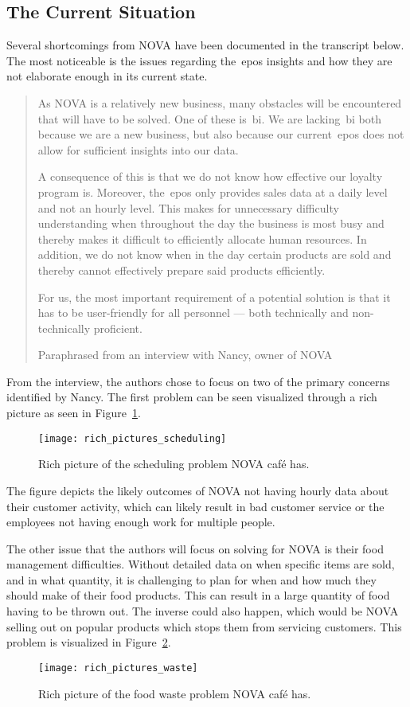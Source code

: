 \subsection{The Current Situation}\label{subsec:the-current-situation}

Several shortcomings from NOVA have been documented in the transcript below.
The most noticeable is the issues regarding the~\acrfull{epos} insights and how they are not elaborate enough in its
current state.

\blockquote[Paraphrased from an interview with Nancy, owner of NOVA]{As NOVA is a relatively new business, many
obstacles will be encountered that will have to be solved.
One of these is~\acrfull{bi}.
We are lacking~\acrshort{bi} both because we are a new business, but also because our current~\acrshort{epos} does not
allow for sufficient insights into our data.

A consequence of this is that we do not know how effective our loyalty program is.
Moreover, the~\acrshort{epos} only provides sales data at a daily level and not an hourly level.
This makes for unnecessary difficulty understanding when throughout the day the business is most busy and thereby makes
it difficult to efficiently allocate human resources.
In addition, we do not know when in the day certain products are sold and thereby cannot effectively prepare said
products efficiently.

For us, the most important requirement of a potential solution is that it has to be user-friendly for all personnel —
both technically and non-technically proficient.}

From the interview, the authors chose to focus on two of the primary concerns identified by Nancy.
The first problem can be seen visualized through a rich picture as seen in Figure~\ref{fig:pda-scheduling-problem}.
\begin{figure}[H]
    \centering
    \texttt{[image: rich\_pictures\_scheduling]}
    \caption{Rich picture of the scheduling problem NOVA café has.}\label{fig:pda-scheduling-problem}
\end{figure}
The figure depicts the likely outcomes of NOVA not having hourly data about their customer activity,
which can likely result in bad customer service or the employees not having enough work for multiple people.

The other issue that the authors will focus on solving for NOVA is their food management difficulties.
Without detailed data on when specific items are sold, and in what quantity, it is challenging to plan
for when and how much they should make of their food products.
This can result in a large quantity of food having to be thrown out.
The inverse could also happen, which would be NOVA selling out on popular products which stops them
from servicing customers.
This problem is visualized in Figure~\ref{fig:pda-waste-problem}.

\begin{figure}[H]
    \centering
    \texttt{[image: rich\_pictures\_waste]}
    \caption{Rich picture of the food waste problem NOVA café has.}\label{fig:pda-waste-problem}
\end{figure}

